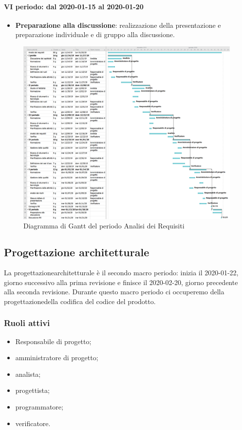 \paragraph*{VI periodo: dal 2020-01-15 al 2020-01-20}
\begin{itemize}
	\item \textbf{Preparazione alla discussione}: realizzazione della presentazione e preparazione individuale e di gruppo alla discussione.
\end{itemize}

\begin{figure}
	\includegraphics[width=\linewidth]{./gantt/Analisi dei requisiti.png}
	\caption{Diagramma di Gantt del periodo Analisi dei Requisiti}
\end{figure}
\pagebreak

\subsection{Progettazione architetturale}
La progettazione\glosp architetturale è il secondo macro periodo: inizia il 2020-01-22, giorno successivo alla prima revisione e finisce il 2020-02-20, giorno precedente alla seconda revisione. Durante questo macro periodo ci occuperemo della progettazione\glosp della codifica del codice del prodotto\glo.

\subsubsection{Ruoli attivi}
\begin{itemize}
	\item Responsabile di progetto\glo;
	\item amministratore di progetto\glo;
	\item analista;
	\item progettista;
	\item programmatore;
	\item verificatore.
\end{itemize}


